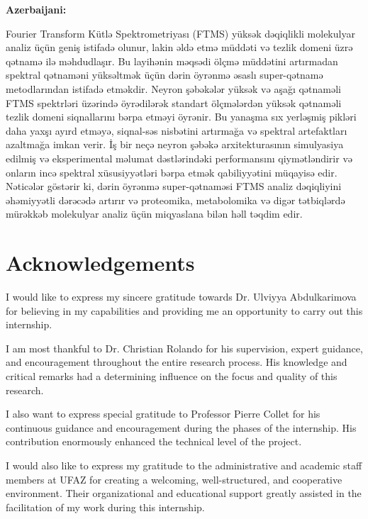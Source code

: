 \documentclass[12pt,a4paper]{report}
\begin{document}
\noindent\textbf{Azerbaijani:}\par
{\azerbaijanifont
  Fourier Transform Kütlə Spektrometriyası (FTMS) yüksək dəqiqlikli molekulyar analiz üçün geniş istifadə olunur, lakin əldə etmə müddəti və tezlik domeni üzrə qətnamə ilə məhdudlaşır. Bu layihənin məqsədi ölçmə müddətini artırmadan spektral qətnaməni yüksəltmək üçün dərin öyrənmə əsaslı super-qətnamə metodlarından istifadə etməkdir. Neyron şəbəkələr yüksək və aşağı qətnaməli FTMS spektrləri üzərində öyrədilərək standart ölçmələrdən yüksək qətnaməli tezlik domeni siqnallarını bərpa etməyi öyrənir. Bu yanaşma sıx yerləşmiş pikləri daha yaxşı ayırd etməyə, siqnal-səs nisbətini artırmağa və spektral artefaktları azaltmağa imkan verir. İş bir neçə neyron şəbəkə arxitekturasının simulyasiya edilmiş və eksperimental məlumat dəstlərindəki performansını qiymətləndirir və onların incə spektral xüsusiyyətləri bərpa etmək qabiliyyətini müqayisə edir. Nəticələr göstərir ki, dərin öyrənmə super-qətnaməsi FTMS analiz dəqiqliyini əhəmiyyətli dərəcədə artırır və proteomika, metabolomika və digər tətbiqlərdə mürəkkəb molekulyar analiz üçün miqyaslana bilən həll təqdim edir.
}

\chapter*{Acknowledgements}

\noindent I would like to express my sincere gratitude towards Dr. Ulviyya Abdulkarimova for believing in my capabilities and providing me an opportunity to carry out this internship.

\noindent I am most thankful to Dr. Christian Rolando for his supervision, expert guidance, and encouragement throughout the entire research process. His knowledge and critical remarks had a determining influence on the focus and quality of this research.

\noindent I also want to express special gratitude to Professor Pierre Collet for his continuous guidance and encouragement during the phases of the internship. His contribution enormously enhanced the technical level of the project.

\noindent I would also like to express my gratitude to the administrative and academic staff members at UFAZ for creating a welcoming, well-structured, and cooperative environment. Their organizational and educational support greatly assisted in the facilitation of my work during this internship.
\end{document}
